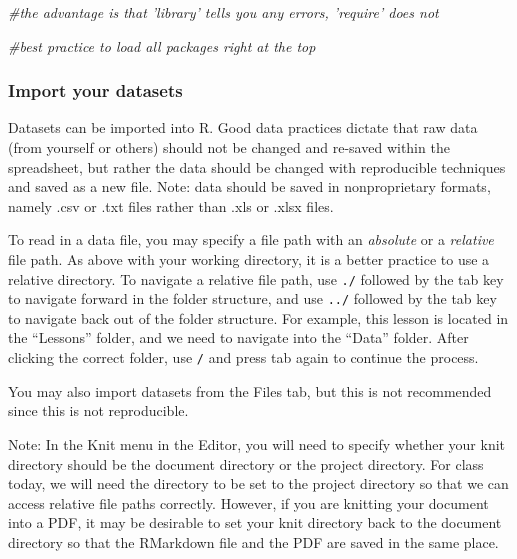 \documentclass[]{article}
\newenvironment{Shaded}{\begin{snugshade}}{\end{snugshade}}
\newcommand{\CommentTok}[1]{\textcolor[rgb]{0.56,0.35,0.01}{\textit{#1}}}
\begin{document}
\begin{Shaded}
\begin{Highlighting}[]
\CommentTok{#the advantage is that 'library' tells you any errors, 'require' does not}

\CommentTok{#best practice to load all packages right at the top}
\end{Highlighting}
\end{Shaded}

\subsubsection{Import your datasets}\label{import-your-datasets}

Datasets can be imported into R. Good data practices dictate that raw
data (from yourself or others) should not be changed and re-saved within
the spreadsheet, but rather the data should be changed with reproducible
techniques and saved as a new file. Note: data should be saved in
nonproprietary formats, namely .csv or .txt files rather than .xls or
.xlsx files.

To read in a data file, you may specify a file path with an
\emph{absolute} or a \emph{relative} file path. As above with your
working directory, it is a better practice to use a relative directory.
To navigate a relative file path, use \texttt{./} followed by the tab
key to navigate forward in the folder structure, and use \texttt{../}
followed by the tab key to navigate back out of the folder structure.
For example, this lesson is located in the ``Lessons'' folder, and we
need to navigate into the ``Data'' folder. After clicking the correct
folder, use \texttt{/} and press tab again to continue the process.

You may also import datasets from the Files tab, but this is not
recommended since this is not reproducible.

Note: In the Knit menu in the Editor, you will need to specify whether
your knit directory should be the document directory or the project
directory. For class today, we will need the directory to be set to the
project directory so that we can access relative file paths correctly.
However, if you are knitting your document into a PDF, it may be
desirable to set your knit directory back to the document directory so
that the RMarkdown file and the PDF are saved in the same place.
\end{document}
